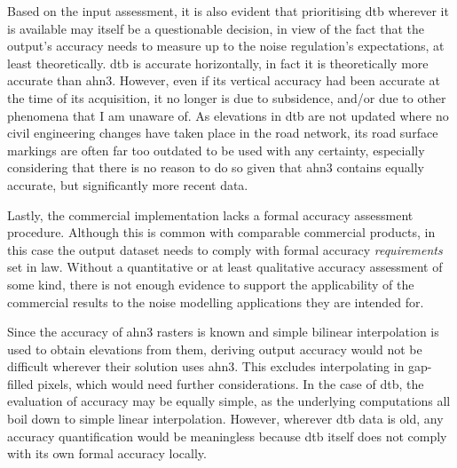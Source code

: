 Based on the input assessment, it is also evident that prioritising \ac{dtb} wherever it is available may itself be a questionable decision, in view of the fact that the output's accuracy needs to measure up to the noise regulation's expectations, at least theoretically. \ac{dtb} is accurate horizontally, in fact it is theoretically more accurate than \ac{ahn3}. However, even if its vertical accuracy had been accurate at the time of its acquisition, it no longer is due to subsidence, and/or due to other phenomena that I am unaware of. As elevations in \ac{dtb} are not updated where no civil engineering changes have taken place in the road network, its road surface markings are often far too outdated to be used with any certainty, especially considering that there is no reason to do so given that \ac{ahn3} contains equally accurate, but significantly more recent data.

Lastly, the commercial implementation lacks a formal accuracy assessment procedure. Although this is common with comparable commercial products, in this case the output dataset needs to comply with formal accuracy \textit{requirements} set in law. Without a quantitative or at least qualitative accuracy assessment of some kind, there is not enough evidence to support the applicability of the commercial results to the noise modelling applications they are intended for.

Since the accuracy of \ac{ahn3} rasters is known and simple bilinear interpolation is used to obtain elevations from them, deriving output accuracy would not be difficult wherever their solution uses \ac{ahn3}. This excludes interpolating in gap-filled pixels, which would need further considerations. In the case of \ac{dtb}, the evaluation of accuracy may be equally simple, as the underlying computations all boil down to simple linear interpolation. However, wherever \ac{dtb} data is old, any accuracy quantification would be meaningless because \ac{dtb} itself does not comply with its own formal accuracy locally.